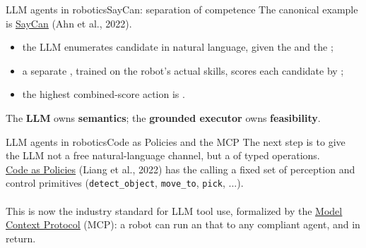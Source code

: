 \begin{frame}{LLM agents in robotics}{SayCan: separation of competence}
  \justifying
  The canonical example is \href{https://say-can.github.io}{\color{blue}\underline{SayCan}} (Ahn et al., 2022).\\
  \bigskip
  \begin{itemize}
    \item the LLM enumerates candidate  in natural language, given the  and the ;
    \item a separate , trained on the robot's actual skills, scores each candidate by ;
    \item the highest combined-score action is .
  \end{itemize}
  \bigskip
  \begin{block}{}
    \centering
    The \textbf{LLM} owns \textbf{semantics}; the \textbf{grounded executor} owns \textbf{feasibility}.
  \end{block}
\end{frame}
\begin{frame}{LLM agents in robotics}{Code as Policies and the MCP}
  \justifying
  The next step is to give the LLM not a free natural-language channel, but a  of typed operations.\\
  \bigskip
  \href{https://code-as-policies.github.io}{\color{blue}\underline{Code as Policies}} (Liang et al., 2022) has the  calling a fixed set of perception and control primitives (\texttt{detect\_object}, \texttt{move\_to}, \texttt{pick}, ...).\\
  \\
  \bigskip
  This is now the industry standard for LLM tool use, formalized by the \href{https://modelcontextprotocol.io}{\color{blue}\underline{Model Context Protocol}} (MCP): a robot can run an  that  to any compliant agent, and  in return.
\end{frame}
